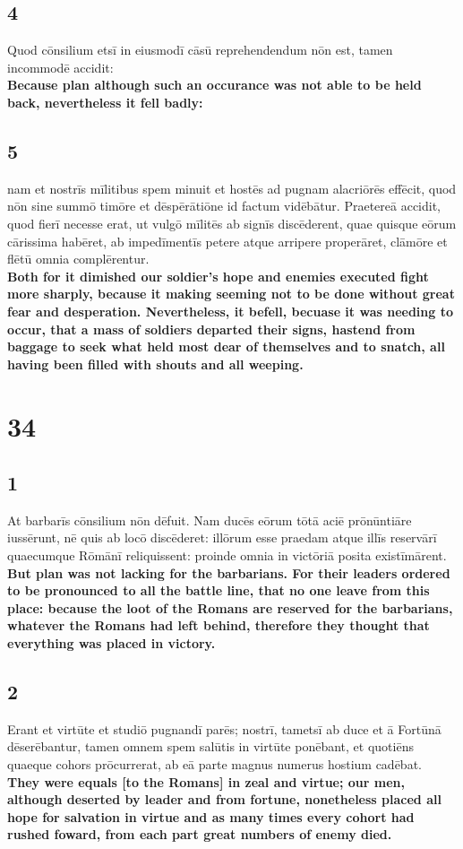 \documentclass{article}
\begin{document}
\subsection*{4}
Quod cōnsilium etsī in eiusmodī cāsū reprehendendum nōn est, tamen incommodē accidit:\\
\textbf{Because plan although such an occurance was not able to be held back, nevertheless it fell badly:}


\subsection*{5}
nam et nostrīs mīlitibus spem minuit et hostēs ad pugnam alacriōrēs effēcit, quod nōn sine summō timōre et dēspērātiōne id factum vidēbātur. Praetereā accidit, quod fierī necesse erat, ut vulgō mīlitēs ab signīs discēderent, quae quisque eōrum cārissima habēret, ab impedīmentīs petere atque arripere properāret, clāmōre et flētū omnia complērentur.\\
\textbf{Both for it dimished our soldier's hope and enemies executed fight more sharply, because it making seeming not to be done without great fear and desperation. Nevertheless, it befell, becuase it was needing to occur, that a mass of soldiers departed their signs, hastend from baggage to seek what held most dear of themselves and to snatch, all having been filled with shouts and all weeping.}

\section*{34}
\subsection*{1}
At barbarīs cōnsilium nōn dēfuit. Nam ducēs eōrum tōtā aciē prōnūntiāre iussērunt, nē quis ab locō discēderet: illōrum esse praedam atque illīs reservārī quaecumque Rōmānī reliquissent: proinde omnia in victōriā posita existīmārent.  \\
\textbf{But plan was not lacking for the barbarians. For their leaders ordered to be pronounced to all the battle line, that no one leave from this place: because the loot of the Romans are reserved for the barbarians, whatever the Romans had left behind, therefore they thought that everything was placed in victory.}
\subsection*{2}
Erant et virtūte et studiō pugnandī parēs; nostrī, tametsī ab duce et ā Fortūnā dēserēbantur, tamen omnem spem salūtis in virtūte ponēbant, et quotiēns quaeque cohors prōcurrerat, ab eā parte magnus numerus hostium cadēbat.  \\
\textbf{They were equals [to the Romans] in zeal and virtue; our men, although deserted by leader and from fortune, nonetheless placed all hope for salvation in virtue and as many times every cohort had rushed foward, from each part great numbers of enemy died.}
\end{document}
